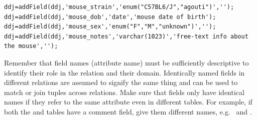 \documentclass[10pt]{article}
\begin{document}
\begin{lstlisting}
ddj=addField(ddj,'mouse_strain','enum("C57BL6/J","agouti")','');
ddj=addField(ddj,'mouse_dob','date','mouse date of birth');
ddj=addField(ddj,'mouse_sex','enum("F","M","unknown")','');
ddj=addField(ddj,'mouse_notes','varchar(1023)','free-text info about the mouse','');
\end{lstlisting}

Remember that field names (attribute name) must be sufficiently descriptive to identify their role in the relation and their domain.  Identically named fields in different relations are assumed to signify the same thing and can be used to match or join tuples across relations.  Make sure that fields only have identical names if they refer to the same attribute even in different tables.  For example, if both the   and  tables have a comment field, give them different names, e.g.~ and .
\end{document}
